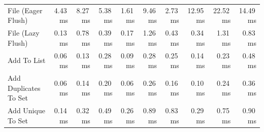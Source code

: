\begin{tabular}{lrrrrrrrrr}
File (Eager Flush) & 4.43\,ms & 8.27\,ms & 5.38\,ms & 1.61\,ms & 9.46\,ms & 2.73\,ms & 12.95\,ms & 22.52\,ms & 14.49\,ms \\
File (Lazy Flush) & 0.13\,ms & 0.78\,ms & 0.39\,ms & 0.17\,ms & 1.26\,ms & 0.43\,ms & 0.34\,ms & 1.31\,ms & 0.83\,ms \\
Add To List & 0.06\,ms & 0.13\,ms & 0.28\,ms & 0.09\,ms & 0.28\,ms & 0.25\,ms & 0.14\,ms & 0.23\,ms & 0.48\,ms \\
Add Duplicates To Set & 0.06\,ms & 0.14\,ms & 0.20\,ms & 0.06\,ms & 0.26\,ms & 0.16\,ms & 0.10\,ms & 0.24\,ms & 0.36\,ms \\
Add Unique To Set & 0.14\,ms & 0.32\,ms & 0.49\,ms & 0.26\,ms & 0.89\,ms & 0.83\,ms & 0.29\,ms & 0.75\,ms & 0.90\,ms \\
\bottomrule
\end{tabular}
